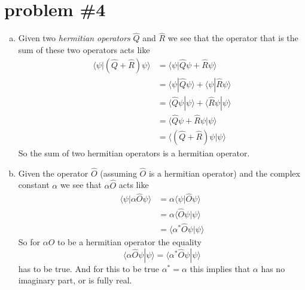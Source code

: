 \documentclass[11pt]{article}
\numberwithin{equation}{section}
\newcommand{\norm}[2]{\langle{#1}|{#2}\rangle}
\begin{document}
\section{problem \#4}
\begin{enumerate}[(a)]
\item
Given two \emph{hermitian operators} $\hat{Q}$ and $\hat{R}$ we see that the operator that is the sum of these two operators acts like
\begin{align*}
\norm{\psi}{(\hat{Q}+\hat{R})\psi} &= \norm{\psi}{\hat{Q}\psi+\hat{R}\psi}\\
&= \norm{\psi}{\hat{Q}\psi}+\norm{\psi}{\hat{R}\psi}\\
&= \norm{\hat{Q}\psi}{\psi}+\norm{\hat{R}\psi}{\psi}\\
&= \norm{\hat{Q}\psi+\hat{R}\psi}{\psi}\\
&= \norm{(\hat{Q}+\hat{R})\psi}{\psi}
\end{align*}
So the sum of two hermitian operators is a hermitian operator.

\item
Given the operator $\hat{O}$ (assuming $\hat{O}$ is a hermitian operator) and the complex constant $\alpha$ we see that $\alpha\hat{O}$ acts like
\begin{align*}
\norm{\psi}{\alpha\hat{O}\psi} &= \alpha\norm{\psi}{\hat{O}\psi}\\
&= \alpha\norm{\hat{O}\psi}{\psi}\\
&= \norm{\alpha^*\hat{O}\psi}{\psi}
\end{align*}
So for $\alpha\hat{O}$ to be a hermitian operator the equality 
$$\norm{\alpha\hat{O}\psi}{\psi} = \norm{\alpha^*\hat{O}\psi}{\psi}$$
has to be true. And for this to be true $\alpha^* = \alpha$ this implies that $\alpha$ has no imaginary part, or is fully real. 


\end{enumerate}
\end{document}
